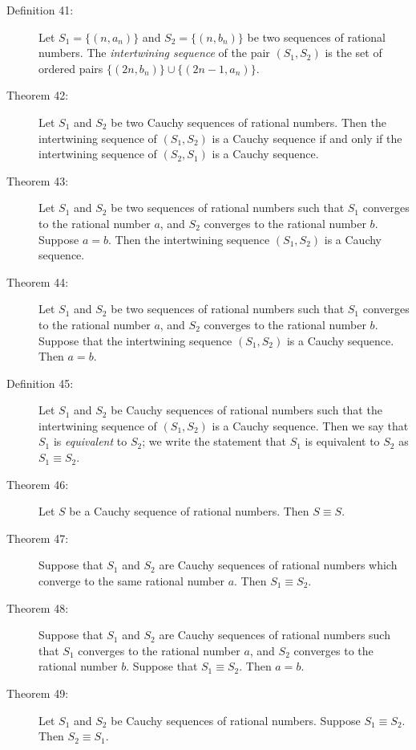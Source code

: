 \documentclass{article}
\begin{document}
\begin{description}
  \item[Definition 41:] Let $S_{1} = \{ (n, a_{n}) \}$ and $S_{2} = \{ (n, b_{n}) \}$ be two sequences of rational numbers. The \emph{intertwining sequence} of the pair $(S_{1}, S_{2})$ is the set of ordered pairs $\{ (2n, b_{n}) \} \cup \{ (2n-1, a_{n}) \}$.

  \item[Theorem 42:] Let $S_{1}$ and $S_{2}$ be two Cauchy sequences of rational numbers. Then the intertwining sequence of $(S_{1}, S_{2})$ is a Cauchy sequence if and only if the intertwining sequence of $(S_{2}, S_{1})$ is a Cauchy sequence. 

  \item[Theorem 43:] Let $S_{1}$ and $S_{2}$ be two sequences of rational numbers such that $S_{1}$ converges to the rational number $a$, and $S_{2}$ converges to the rational number $b$. Suppose $a = b$. Then the intertwining sequence $(S_{1}, S_{2})$ is a Cauchy sequence. 

  \item[Theorem 44:] Let $S_{1}$ and $S_{2}$ be two sequences of rational numbers such that $S_{1}$ converges to the rational number $a$, and $S_{2}$ converges to the rational number $b$. Suppose that the intertwining sequence $(S_{1}, S_{2})$ is a Cauchy sequence. Then $a = b$. 

  \item[Definition 45:] Let $S_{1}$ and $S_{2}$ be Cauchy sequences of rational numbers such that the intertwining sequence of $(S_{1}, S_{2})$ is a Cauchy sequence. Then we say that $S_{1}$ is \emph{equivalent} to $S_{2}$; we write the statement that $S_{1}$ is equivalent to $S_{2}$ as $S_{1} \equiv S_{2}$.

  \item[Theorem 46:] Let $S$ be a Cauchy sequence of rational numbers. Then $S \equiv S$.

  \item[Theorem 47:] Suppose that $S_{1}$ and $S_{2}$ are Cauchy sequences of rational numbers which converge to the same rational number $a$. Then $S_{1} \equiv S_{2}$.

  \item[Theorem 48:] Suppose that $S_{1}$ and $S_{2}$ are Cauchy sequences of rational numbers such that $S_{1}$ converges to the rational number $a$, and $S_{2}$ converges to the rational number $b$. Suppose that $S_{1} \equiv S_{2}$. Then $a = b$.

  \item[Theorem 49:] Let $S_{1}$ and $S_{2}$ be Cauchy sequences of rational numbers. Suppose $S_{1} \equiv S_{2}$. Then $S_{2} \equiv S_{1}$.


\end{description}
\end{document}
